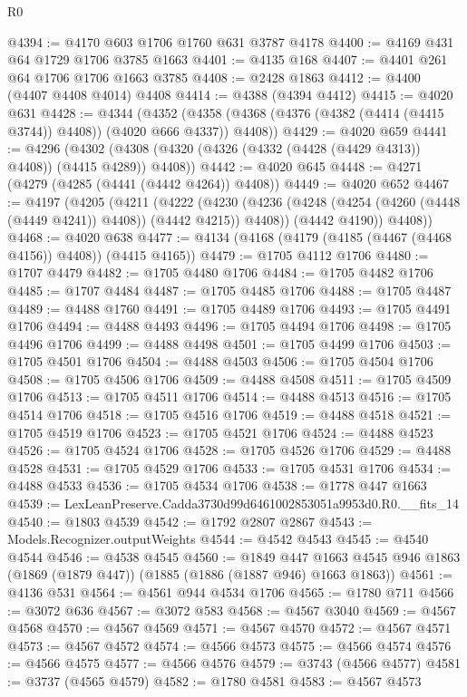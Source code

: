 \begin{lexlean}{R0}
\begin{coremodule}
@4394 := @4170 @603 @1706 @1760 @631 @3787 @4178
@4400 := @4169 @431 @64 @1729 @1706 @3785 @1663
@4401 := @4135 @168
@4407 := @4401 @261 @64 @1706 @1706 @1663 @3785
@4408 := @2428 @1863
@4412 := @4400 (@4407 @4408 @4014) @4408
@4414 := @4388 (@4394 @4412)
@4415 := @4020 @631
@4428 := @4344
    (@4352 (@4358 (@4368 (@4376 (@4382 (@4414 (@4415 @3744)) @4408)) (@4020 @666 @4337)) @4408))
@4429 := @4020 @659
@4441 := @4296
    (@4302 (@4308 (@4320 (@4326 (@4332 (@4428 (@4429 @4313)) @4408)) (@4415 @4289)) @4408))
@4442 := @4020 @645
@4448 := @4271 (@4279 (@4285 (@4441 (@4442 @4264)) @4408))
@4449 := @4020 @652
@4467 := @4197
    (@4205
      (@4211
        (@4222
          (@4230 (@4236 (@4248 (@4254 (@4260 (@4448 (@4449 @4241)) @4408)) (@4442 @4215)) @4408))
          (@4442 @4190))
        @4408))
@4468 := @4020 @638
@4477 := @4134 (@4168 (@4179 (@4185 (@4467 (@4468 @4156)) @4408)) (@4415 @4165))
@4479 := @1705 @4112 @1706
@4480 := @1707 @4479
@4482 := @1705 @4480 @1706
@4484 := @1705 @4482 @1706
@4485 := @1707 @4484
@4487 := @1705 @4485 @1706
@4488 := @1705 @4487
@4489 := @4488 @1760
@4491 := @1705 @4489 @1706
@4493 := @1705 @4491 @1706
@4494 := @4488 @4493
@4496 := @1705 @4494 @1706
@4498 := @1705 @4496 @1706
@4499 := @4488 @4498
@4501 := @1705 @4499 @1706
@4503 := @1705 @4501 @1706
@4504 := @4488 @4503
@4506 := @1705 @4504 @1706
@4508 := @1705 @4506 @1706
@4509 := @4488 @4508
@4511 := @1705 @4509 @1706
@4513 := @1705 @4511 @1706
@4514 := @4488 @4513
@4516 := @1705 @4514 @1706
@4518 := @1705 @4516 @1706
@4519 := @4488 @4518
@4521 := @1705 @4519 @1706
@4523 := @1705 @4521 @1706
@4524 := @4488 @4523
@4526 := @1705 @4524 @1706
@4528 := @1705 @4526 @1706
@4529 := @4488 @4528
@4531 := @1705 @4529 @1706
@4533 := @1705 @4531 @1706
@4534 := @4488 @4533
@4536 := @1705 @4534 @1706
@4538 := @1778 @447 @1663
@4539 := LexLeanPreserve.Cadda3730d99d6461002853051a9953d0.R0.__fits_14
@4540 := @1803 @4539
@4542 := @1792 @2807 @2867
@4543 := Models.Recognizer.outputWeights
@4544 := @4542 @4543
@4545 := @4540 @4544
@4546 := @4538 @4545
@4560 := @1849
    @447
    @1663
    @4545
    @946
    @1863
    (@1869 (@1879 @447))
    (@1885 (@1886 (@1887 @946) @1663 @1863))
@4561 := @4136 @531
@4564 := @4561 @944 @4534 @1706
@4565 := @1780 @711
@4566 := @3072 @636
@4567 := @3072 @583
@4568 := @4567 @3040
@4569 := @4567 @4568
@4570 := @4567 @4569
@4571 := @4567 @4570
@4572 := @4567 @4571
@4573 := @4567 @4572
@4574 := @4566 @4573
@4575 := @4566 @4574
@4576 := @4566 @4575
@4577 := @4566 @4576
@4579 := @3743 (@4566 @4577)
@4581 := @3737 (@4565 @4579)
@4582 := @1780 @4581
@4583 := @4567 @4573

\end{coremodule}
\end{lexlean}
